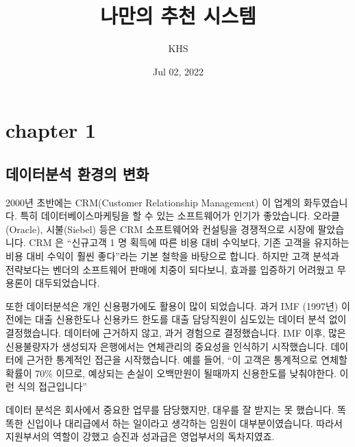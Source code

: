 \documentclass[letterpaper,10pt,english]{jupyterBook}
\title{나만의 추천 시스템}
\date{Jul 02, 2022}
\author{KHS}
\begin{document}
\pagestyle{empty}
\sphinxmaketitle
\pagestyle{plain}
\sphinxtableofcontents
\pagestyle{normal}
\label{\detokenize{intro::doc}}


\begin{DUlineblock}{0em}
\item[] 
\end{DUlineblock}


\part{chapter 1}


\chapter{}
\label{\detokenize{chapter1/1.1.0_SOP:id1}}\label{\detokenize{chapter1/1.1.0_SOP::doc}}



\chapter{데이터분석 환경의 변화}
\label{\detokenize{chapter1/1.2.0_Data_Science:id1}}\label{\detokenize{chapter1/1.2.0_Data_Science::doc}}


\sphinxAtStartPar
2000년 초반에는 CRM(Customer Relationship Management) 이  업계의 화두였습니다. 특히 데이터베이스마케팅을 할 수 있는 소프트웨어가 인기가 좋았습니다. 오라클(Oracle), 시불(Siebel) 등은 CRM 소프트웨어와 컨설팅을 경쟁적으로 시장에 팔았습니다. CRM 은 “신규고객 1 명 획득에 따른 비용 대비 수익보다, 기존 고객을 유지하는 비용 대비 수익이 훨씬 좋다”라는 기본 철학을 바탕으로 합니다. 하지만 고객 분석과 전략보다는 벤더의 소프트웨어 판매에 치중이 되다보니, 효과를 입증하기 어려웠고 무용론이 대두되었습니다.

\sphinxAtStartPar
또한 데이터분석은 개인 신용평가에도 활용이 많이 되었습니다. 과거 IMF (1997년) 이전에는 대출 신용한도나 신용카드 한도를 대출 담당직원이 심도있는 데이터 분석 없이 결정했습니다. 데이터에 근거하지 않고, 과거 경험으로 결정했습니다. IMF 이후, 많은 신용불량자가 생성되자 은행에서는 연체관리의 중요성을 인식하기 시작했습니다. 데이터에 근거한 통계적인 접근을 시작했습니다. 예를 들어, “이 고객은 통계적으로 연체할 확률이 70\% 이므로, 예상되는 손실이 오백만원이 될때까지 신용한도를 낮춰야한다. 이런 식의 접근입니다”

\sphinxAtStartPar
데이터 분석은 회사에서 중요한 업무를 담당했지만, 대우를 잘 받지는 못 했습니다. 똑똑한 신입이나 대리급에서 하는 일이라고 생각하는 임원이 대부분이였습니다. 따라서 지원부서의 역할이 강했고 승진과 성과급은 영업부서의 독차지였죠.
\end{document}
